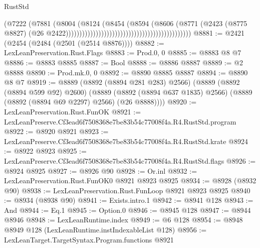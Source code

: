 \begin{lexlean}{RustStd}
\begin{coremodule}
                                                                            (@7222
                                                                              (@7881
                                                                                (@8004
                                                                                  (@8124
                                                                                    (@8454
                                                                                      (@8594
                                                                                        (@8606
                                                                                          (@8771
                                                                                            (@2423
                                                                                              (@8775
                                                                                                @8827)
                                                                                              (@26
                                                                                                @2422))))))))))))))))))))))))))))))))))))))))))))))
@8881 := @2421 (@2454 (@2484 (@2501 (@2514 @8876))))
@8882 := LexLeanPreservation.Rust.Flags
@8883 := Prod.{0, 0}
@8885 := @8883 @8 @7
@8886 := @8883 @8885
@8887 := Bool
@8888 := @8886 @8887
@8889 := @2 @8888
@8890 := Prod.mk.{0, 0}
@8892 := @8890 @8885 @8887
@8894 := @8890 @8 @7
@8919 := @8889
    (@8892 (@8894 @281 @283) @2566)
    (@8889
      (@8892 (@8894 @599 @92) @2600)
      (@8889 (@8892 (@8894 @637 @1835) @2566) (@8889 (@8892 (@8894 @69 @2297) @2566) (@26 @8888))))
@8920 := LexLeanPreservation.Rust.FunOK
@8921 := LexLeanPreserve.Cf3ead6f7508368e7be83b54c77008f4a.R4.RustStd.program
@8922 := @8920 @8921
@8923 := LexLeanPreserve.Cf3ead6f7508368e7be83b54c77008f4a.R4.RustStd.krate
@8924 := @8922 @8923
@8925 := LexLeanPreserve.Cf3ead6f7508368e7be83b54c77008f4a.R4.RustStd.flags
@8926 := @8924 @8925
@8927 := @8926 @90
@8928 := Or.inl
@8932 := LexLeanPreservation.Rust.FunOK0 @8921 @8923 @8925
@8934 := @8928 (@8932 @90)
@8938 := LexLeanPreservation.Rust.FunLoop @8921 @8923 @8925
@8940 := @8934 (@8938 @90)
@8941 := Exists.intro.{1}
@8942 := @8941 @128
@8943 := And
@8944 := Eq.{1}
@8945 := Option.{0}
@8946 := @8945 @128
@8947 := @8944 @8946
@8948 := LexLeanRuntime.index
@8949 := @6 @128
@8954 := @8948 @8949 @128 (LexLeanRuntime.instIndexableList @128)
@8956 := LexLeanTarget.TargetSyntax.Program.functions @8921

\end{coremodule}
\end{lexlean}
